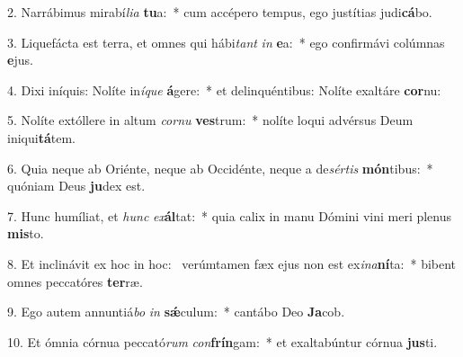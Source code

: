 2. Narrábimus mirabí\textit{li}\textit{a} \textbf{tu}a:~*  cum accépero tempus, ego justítias judi\textbf{cá}bo.\

3. Liquefácta est terra, et omnes qui hábi\textit{tant} \textit{in} \textbf{e}a:~*  ego confirmávi colúmnas \textbf{e}jus.\

4. Dixi iníquis: Nolíte in\textit{í}\textit{que} \textbf{á}gere:~*  et delinquéntibus: Nolíte exaltáre \textbf{cor}nu:\

5. Nolíte extóllere in altum \textit{cor}\textit{nu} \textbf{ves}trum:~*  nolíte loqui advérsus Deum iniqui\textbf{tá}tem.\

6. Quia neque ab Oriénte, neque ab Occidénte, neque a de\textit{sér}\textit{tis} \textbf{món}tibus:~*  quóniam Deus \textbf{ju}dex est.\

7. Hunc humíliat, et \textit{hunc} \textit{ex}\textbf{ál}tat:~*  quia calix in manu Dómini vini meri plenus \textbf{mis}to.\

8. Et inclinávit ex hoc in hoc: \dag\  verúmtamen fæx ejus non est ex\textit{i}\textit{na}\textbf{ní}ta:~*  bibent omnes peccatóres \textbf{ter}ræ.\

9. Ego autem annuntiá\textit{bo} \textit{in} \textbf{sǽ}culum:~*  cantábo Deo \textbf{Ja}cob.\

10. Et ómnia córnua peccató\textit{rum} \textit{con}\textbf{frín}gam:~*  et exaltabúntur córnua \textbf{jus}ti.\

